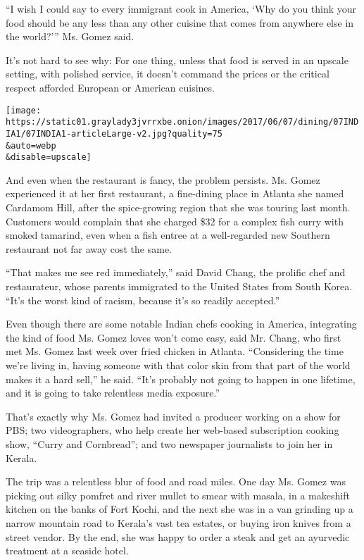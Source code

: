 ``I wish I could say to every immigrant cook in America, `Why do you
think your food should be any less than any other cuisine that comes
from anywhere else in the world?''' Ms. Gomez said.

It's not hard to see why: For one thing, unless that food is served in
an upscale setting, with polished service, it doesn't command the prices
or the critical respect afforded European or American cuisines.

\texttt{[image: https://static01.graylady3jvrrxbe.onion/images/2017/06/07/dining/07INDIA1/07INDIA1-articleLarge-v2.jpg?quality=75\\\&auto=webp\\\&disable=upscale]}

And even when the restaurant is fancy, the problem persists. Ms. Gomez
experienced it at her first restaurant, a fine-dining place in Atlanta
she named Cardamom Hill, after the spice-growing region that she was
touring last month. Customers would complain that she charged \$32 for a
complex fish curry with smoked tamarind, even when a fish entree at a
well-regarded new Southern restaurant not far away cost the same.

``That makes me see red immediately,'' said David Chang, the prolific
chef and restaurateur, whose parents immigrated to the United States
from South Korea. ``It's the worst kind of racism, because it's so
readily accepted.''

Even though there are some notable Indian chefs cooking in America,
integrating the kind of food Ms. Gomez loves won't come easy, said Mr.
Chang, who first met Ms. Gomez last week over fried chicken in Atlanta.
``Considering the time we're living in, having someone with that color
skin from that part of the world makes it a hard sell,'' he said. ``It's
probably not going to happen in one lifetime, and it is going to take
relentless media exposure.''

That's exactly why Ms. Gomez had invited a producer working on a show
for PBS; two videographers, who help create her web-based subscription
cooking show, ``Curry and Cornbread''; and two newspaper journalists to
join her in Kerala.

The trip was a relentless blur of food and road miles. One day Ms. Gomez
was picking out silky pomfret and river mullet to smear with masala, in
a makeshift kitchen on the banks of Fort Kochi, and the next she was in
a van grinding up a narrow mountain road to Kerala's vast tea estates,
or buying iron knives from a street vendor. By the end, she was happy to
order a steak and get an ayurvedic treatment at a seaside hotel.

